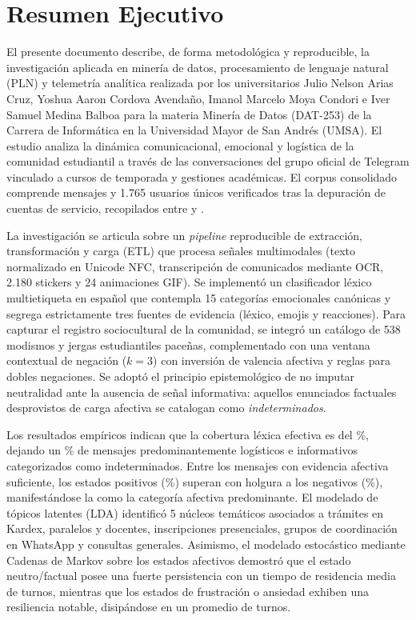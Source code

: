 \section*{Resumen Ejecutivo}

El presente documento describe, de forma metodológica y reproducible, la investigación aplicada en minería de datos, procesamiento de lenguaje natural (PLN) y telemetría analítica realizada por los universitarios Julio Nelson Arias Cruz, Yoshua Aaron Cordova Avendaño, Imanol Marcelo Moya Condori e Iver Samuel Medina Balboa para la materia Minería de Datos (DAT-253) de la Carrera de Informática en la Universidad Mayor de San Andrés (UMSA). El estudio analiza la dinámica comunicacional, emocional y logística de la comunidad estudiantil a través de las conversaciones del grupo oficial de Telegram vinculado a cursos de temporada y gestiones académicas. El corpus consolidado comprende \nMensajes{} mensajes y 1.765 usuarios únicos verificados tras la depuración de cuentas de servicio, recopilados entre \manualInicio{} y \manualFin{}.

La investigación se articula sobre un \emph{pipeline} reproducible de extracción, transformación y carga (ETL) que procesa señales multimodales (texto normalizado en Unicode NFC, transcripción de comunicados mediante OCR, 2.180 stickers y 24 animaciones GIF). Se implementó un clasificador léxico multietiqueta en español que contempla 15 categorías emocionales canónicas y segrega estrictamente tres fuentes de evidencia (léxico, emojis y reacciones). Para capturar el registro sociocultural de la comunidad, se integró un catálogo de 538 modismos y jergas estudiantiles paceñas, complementado con una ventana contextual de negación ($k=3$) con inversión de valencia afectiva y reglas para dobles negaciones. Se adoptó el principio epistemológico de no imputar neutralidad ante la ausencia de señal informativa: aquellos enunciados factuales desprovistos de carga afectiva se catalogan como \emph{indeterminados}.

Los resultados empíricos indican que la cobertura léxica efectiva es del \pctCobertura{}\%, dejando un \pctIndeterminado{}\% de mensajes predominantemente logísticos e informativos categorizados como indeterminados. Entre los mensajes con evidencia afectiva suficiente, los estados positivos (\pctPositivos{}\%) superan con holgura a los negativos (\pctNegativos{}\%), manifestándose la \emph{\emocionTop{}} como la categoría afectiva predominante. El modelado de tópicos latentes (LDA) identificó 5 núcleos temáticos asociados a trámites en Kardex, paralelos y docentes, inscripciones presenciales, grupos de coordinación en WhatsApp y consultas generales. Asimismo, el modelado estocástico mediante Cadenas de Markov sobre los estados afectivos demostró que el estado neutro/factual posee una fuerte persistencia con un tiempo de residencia media de \permanenciaNeutro{} turnos, mientras que los estados de frustración o ansiedad exhiben una resiliencia notable, disipándose en un promedio de \recuperacionNegativa{} turnos.

